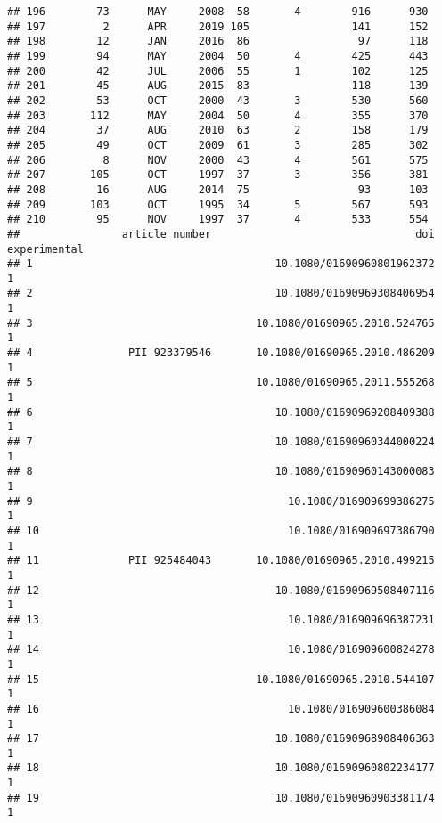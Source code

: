 \documentclass[
  english,
  man]{apa6}
\begin{document}
\begin{verbatim}
## 196        73      MAY     2008  58       4        916      930
## 197         2      APR     2019 105                141      152
## 198        12      JAN     2016  86                 97      118
## 199        94      MAY     2004  50       4        425      443
## 200        42      JUL     2006  55       1        102      125
## 201        45      AUG     2015  83                118      139
## 202        53      OCT     2000  43       3        530      560
## 203       112      MAY     2004  50       4        355      370
## 204        37      AUG     2010  63       2        158      179
## 205        49      OCT     2009  61       3        285      302
## 206         8      NOV     2000  43       4        561      575
## 207       105      OCT     1997  37       3        356      381
## 208        16      AUG     2014  75                 93      103
## 209       103      OCT     1995  34       5        567      593
## 210        95      NOV     1997  37       4        533      554
##                article_number                                doi experimental
## 1                                      10.1080/01690960801962372            1
## 2                                      10.1080/01690969308406954            1
## 3                                   10.1080/01690965.2010.524765            1
## 4               PII 923379546       10.1080/01690965.2010.486209            1
## 5                                   10.1080/01690965.2011.555268            1
## 6                                      10.1080/01690969208409388            1
## 7                                      10.1080/01690960344000224            1
## 8                                      10.1080/01690960143000083            1
## 9                                        10.1080/016909699386275            1
## 10                                       10.1080/016909697386790            1
## 11              PII 925484043       10.1080/01690965.2010.499215            1
## 12                                     10.1080/01690969508407116            1
## 13                                       10.1080/016909696387231            1
## 14                                       10.1080/016909600824278            1
## 15                                  10.1080/01690965.2010.544107            1
## 16                                       10.1080/016909600386084            1
## 17                                     10.1080/01690968908406363            1
## 18                                     10.1080/01690960802234177            1
## 19                                     10.1080/01690960903381174            1

\end{verbatim}
\end{document}
